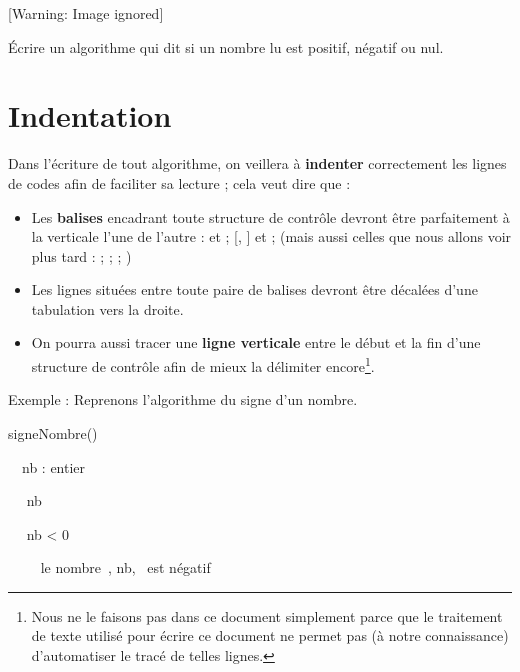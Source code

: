 \begin{center}
 [Warning: Image ignored] %

\end{center}
{
Écrire un algorithme qui dit si un nombre lu est positif, négatif ou
nul.}

\section{Indentation}
{
Dans l’écriture de tout algorithme, on veillera à \textbf{indenter}
correctement les lignes de codes afin de faciliter sa lecture ; cela
veut dire que : }

\liststyleListv
\begin{itemize}
\item {
Les \textbf{balises} encadrant toute structure de contrôle devront être
parfaitement à la verticale l’une de l’autre : 
et  ; 
[, ] et 
; (mais aussi celles que nous allons voir plus tard
:  ; 
; 
 
; )}
\item {
Les lignes situées entre toute paire de balises devront être décalées
d'une tabulation vers la droite.}
\item {
On pourra aussi tracer une \textbf{ligne verticale} entre le début et la
fin d'une structure de contrôle afin de mieux la
délimiter encore\footnote{Nous ne le faisons pas dans ce document
simplement parce que le traitement de texte utilisé pour écrire ce
document ne permet pas (à notre connaissance)
d'automatiser le tracé de telles lignes.}. }
\end{itemize}
{
Exemple : Reprenons l'algorithme du signe
d'un nombre.}

{\sffamily
{} signeNombre()}

{\ \ nb : entier}

{\sffamily
\ \  nb}

{\sffamily
\ \  nb {\textless} 0 }

{\ \ \ \ 
{\textquotedbl}le nombre~{\textquotedbl}, nb, {\textquotedbl}~est
négatif{\textquotedbl}}

